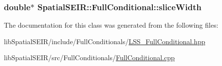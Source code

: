 \hypertarget{classSpatialSEIR_1_1FullConditional_a150ee031af8d086ad0a04b13630a110f}{
\subsubsection[{slice\-Width}]{\setlength{\rightskip}{0pt plus 5cm}double$\ast$ Spatial\-S\-E\-I\-R\-::\-Full\-Conditional\-::slice\-Width}}\label{classSpatialSEIR_1_1FullConditional_a150ee031af8d086ad0a04b13630a110f}


The documentation for this class was generated from the following files\-:\begin{DoxyCompactItemize}
\item 
lib\-Spatial\-S\-E\-I\-R/include/\-Full\-Conditionals/\hyperlink{LSS__FullConditional_8hpp}{L\-S\-S\-\_\-\-Full\-Conditional.\-hpp}\item 
lib\-Spatial\-S\-E\-I\-R/src/\-Full\-Conditionals/\hyperlink{FullConditional_8cpp}{Full\-Conditional.\-cpp}\end{DoxyCompactItemize}
